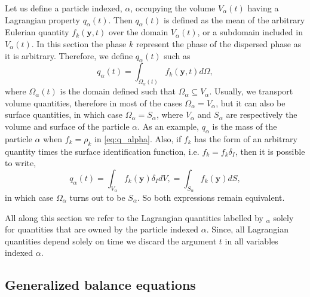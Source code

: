 Let us define a particle indexed, $\alpha$, occupying the volume $V_\alpha(t)$ having a Lagrangian property $q_\alpha(t)$.
Then $q_\alpha(t)$ is defined as the mean of the arbitrary Eulerian quantity $f_k(\textbf{y},t)$ over the domain $V_\alpha(t)$, or a subdomain included in $V_\alpha(t)$.
In this section the phase $k$ represent the phase of the dispersed phase as it is arbitrary. 
Therefore, we define $q_\alpha(t)$ such as 
\begin{equation}
    q_\alpha(t)
    = \int_{\Omega_\alpha(t)} f_k(\textbf{y},t) d\Omega,
    \label{eq:q_alpha}
\end{equation}
where $\Omega_\alpha(t)$ is the domain defined such that $\Omega_\alpha \subseteq  V_\alpha$.
Usually, we transport volume quantities, therefore in most of the cases $\Omega_\alpha = V_\alpha$, but it can also be surface quantities, in which case $\Omega_\alpha = S_\alpha$, where $V_\alpha$ and $S_\alpha$ are respectively the volume and surface of the particle $\alpha$.
As an example, $q_\alpha$ is the mass of the particle $\alpha$ when $f_k = \rho_k$ in \ref{eq:q_alpha}.
Also, if $f_k$ has the form of an arbitrary quantity times the surface identification function, i.e. $f_k = f_k \delta_I$, then it is possible to write, 
\begin{equation}
    q_\alpha(t)
    = \int_{V_\alpha} f_k(\textbf{y}) \delta_I dV,
    = \int_{S_\alpha} f_k(\textbf{y}) dS,
    \label{eq:q_surf_alpha}
\end{equation}
in which case $\Omega_\alpha$ turns out to be $S_\alpha$. 
So both expressions remain equivalent. 

All along this section we refer to the Lagrangian quantities labelled by $_\alpha$ solely for quantities that are owned by the particle indexed $\alpha$.
Since, all Lagrangian quantities depend solely on time we discard the argument $t$ in all variables indexed $\alpha$.

\subsection{Generalized balance equations}

